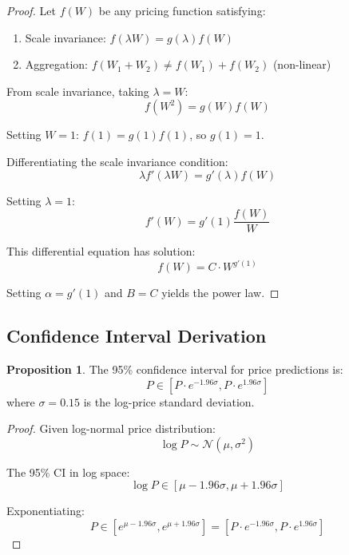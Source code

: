 \documentclass[12pt,a4paper]{article}
\theoremstyle{definition}
\newtheorem{proposition}{Proposition}
\theoremstyle{remark}
\begin{document}
\begin{proof}
Let $f(W)$ be any pricing function satisfying:
\begin{enumerate}
\item Scale invariance: $f(\lambda W) = g(\lambda) f(W)$
\item Aggregation: $f(W_1 + W_2) \neq f(W_1) + f(W_2)$ (non-linear)
\end{enumerate}

From scale invariance, taking $\lambda = W$:
\begin{equation}
f(W^2) = g(W) f(W)
\end{equation}

Setting $W = 1$: $f(1) = g(1) f(1)$, so $g(1) = 1$.

Differentiating the scale invariance condition:
\begin{equation}
\lambda f'(\lambda W) = g'(\lambda) f(W)
\end{equation}

Setting $\lambda = 1$:
\begin{equation}
f'(W) = g'(1) \frac{f(W)}{W}
\end{equation}

This differential equation has solution:
\begin{equation}
f(W) = C \cdot W^{g'(1)}
\end{equation}

Setting $\alpha = g'(1)$ and $B = C$ yields the power law.
\end{proof}

\subsection{Confidence Interval Derivation}

\begin{proposition}
The 95\% confidence interval for price predictions is:
\begin{equation}
P \in \left[ P \cdot e^{-1.96\sigma}, P \cdot e^{1.96\sigma} \right]
\end{equation}
where $\sigma = 0.15$ is the log-price standard deviation.
\end{proposition}

\begin{proof}
Given log-normal price distribution:
\begin{equation}
\log P \sim \mathcal{N}(\mu, \sigma^2)
\end{equation}

The 95\% CI in log space:
\begin{equation}
\log P \in [\mu - 1.96\sigma, \mu + 1.96\sigma]
\end{equation}

Exponentiating:
\begin{equation}
P \in [e^{\mu - 1.96\sigma}, e^{\mu + 1.96\sigma}] = [P \cdot e^{-1.96\sigma}, P \cdot e^{1.96\sigma}]
\end{equation}
\end{proof}
\end{document}
